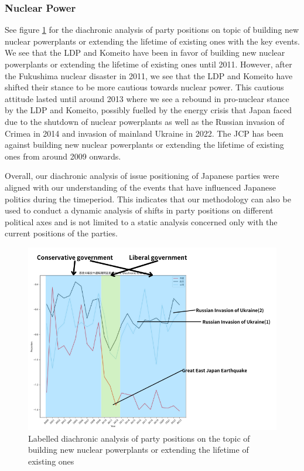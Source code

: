 \documentclass[final,5p,times,twocolumn,authoryear]{elsarticle}
\begin{document}
\subsubsection{Nuclear Power}
See figure \ref{fig:diachronic-nuclear} for the diachronic analysis of party positions on topic of building new nuclear powerplants or extending the lifetime of existing ones with the key events. We see that the LDP and Komeito have been in favor of building new nuclear powerplants or extending the lifetime of existing ones until 2011. However, after the Fukushima nuclear disaster in 2011, we see that the LDP and Komeito have shifted their stance to be more cautious towards nuclear power. This cautious attitude lasted until around 2013 where we see a rebound in pro-nuclear stance by the LDP and Komeito, possibly fuelled by the energy crisis that Japan faced due to the shutdown of nuclear powerplants as well as the Russian invasion of Crimea in 2014 and invasion of mainland Ukraine in 2022. The JCP has been against building new nuclear powerplants or extending the lifetime of existing ones from around 2009 onwards. 

Overall, our diachronic analysis of issue positioning of Japanese parties were aligned with our understanding of the events that have influenced Japanese politics during the timeperiod. This indicates that our methodology can also be used to conduct a dynamic analysis of shifts in party positions on different political axes and is not limited to a static analysis concerned only with the current positions of the parties.

\begin{figure}
	\centering
	  \centering
	  \includegraphics[width=\linewidth]{figs/nuclear diachronic.png}
	  \caption{Labelled diachronic analysis of party positions on the topic of building new nuclear powerplants or extending the lifetime of existing ones}
	  \label{fig:diachronic-nuclear}
\end{figure}
\end{document}
